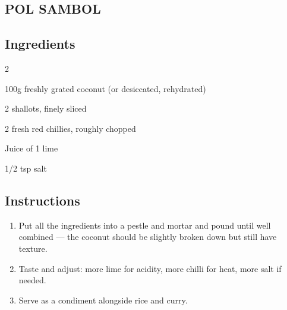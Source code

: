 \begin{minipage}{0.98\textwidth}
\subsection*{POL SAMBOL}
\subsection*{Ingredients}
\begin{multicols}{2}
\begin{ingredients}
    \item 100g freshly grated coconut (or desiccated, rehydrated)
    \item 2 shallots, finely sliced
    \item 2 fresh red chillies, roughly chopped
    \item Juice of 1 lime
    \item 1/2 tsp salt
\end{ingredients}
\end{multicols}
\subsection*{Instructions}
\begin{enumerate}
    \item Put all the ingredients into a pestle and mortar and pound until well combined — the coconut should be slightly broken down but still have texture.
    \item Taste and adjust: more lime for acidity, more chilli for heat, more salt if needed.
    \item Serve as a condiment alongside rice and curry.
\end{enumerate}

\end{minipage}
\vspace{4em}